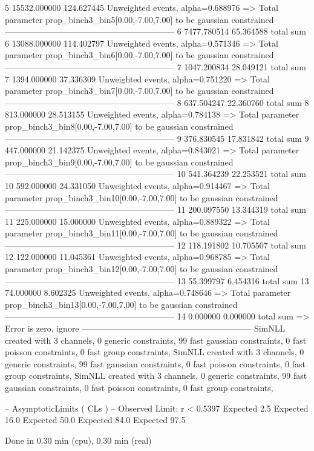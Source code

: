 5          15532.000000    124.627445      Unweighted events, alpha=0.688976
  => Total parameter prop_binch3_bin5[0.00,-7.00,7.00] to be gaussian constrained
------------------------------------------------------------
6          7477.780514     65.364588       total sum                     
6          13088.000000    114.402797      Unweighted events, alpha=0.571346
  => Total parameter prop_binch3_bin6[0.00,-7.00,7.00] to be gaussian constrained
------------------------------------------------------------
7          1047.200834     28.049121       total sum                     
7          1394.000000     37.336309       Unweighted events, alpha=0.751220
  => Total parameter prop_binch3_bin7[0.00,-7.00,7.00] to be gaussian constrained
------------------------------------------------------------
8          637.504247      22.360760       total sum                     
8          813.000000      28.513155       Unweighted events, alpha=0.784138
  => Total parameter prop_binch3_bin8[0.00,-7.00,7.00] to be gaussian constrained
------------------------------------------------------------
9          376.830545      17.831842       total sum                     
9          447.000000      21.142375       Unweighted events, alpha=0.843021
  => Total parameter prop_binch3_bin9[0.00,-7.00,7.00] to be gaussian constrained
------------------------------------------------------------
10         541.364239      22.253521       total sum                     
10         592.000000      24.331050       Unweighted events, alpha=0.914467
  => Total parameter prop_binch3_bin10[0.00,-7.00,7.00] to be gaussian constrained
------------------------------------------------------------
11         200.097550      13.344319       total sum                     
11         225.000000      15.000000       Unweighted events, alpha=0.889322
  => Total parameter prop_binch3_bin11[0.00,-7.00,7.00] to be gaussian constrained
------------------------------------------------------------
12         118.191802      10.705507       total sum                     
12         122.000000      11.045361       Unweighted events, alpha=0.968785
  => Total parameter prop_binch3_bin12[0.00,-7.00,7.00] to be gaussian constrained
------------------------------------------------------------
13         55.399797       6.454316        total sum                     
13         74.000000       8.602325        Unweighted events, alpha=0.748646
  => Total parameter prop_binch3_bin13[0.00,-7.00,7.00] to be gaussian constrained
------------------------------------------------------------
14         0.000000        0.000000        total sum                     
  => Error is zero, ignore      
------------------------------------------------------------
SimNLL created with 3 channels, 0 generic constraints, 99 fast gaussian constraints, 0 fast poisson constraints, 0 fast group constraints, 
SimNLL created with 3 channels, 0 generic constraints, 99 fast gaussian constraints, 0 fast poisson constraints, 0 fast group constraints, 
SimNLL created with 3 channels, 0 generic constraints, 99 fast gaussian constraints, 0 fast poisson constraints, 0 fast group constraints, 

 -- AsymptoticLimits ( CLs ) --
Observed Limit: r < 0.5397
Expected  2.5%
Expected 16.0%
Expected 50.0%
Expected 84.0%
Expected 97.5%

Done in 0.30 min (cpu), 0.30 min (real)
